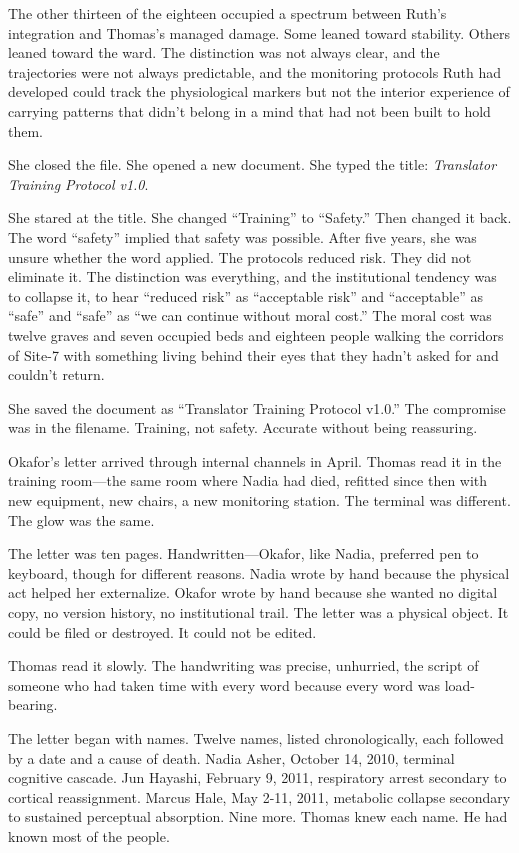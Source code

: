 The other thirteen of the eighteen occupied a spectrum between Ruth's integration and Thomas's managed damage. Some leaned toward stability. Others leaned toward the ward. The distinction was not always clear, and the trajectories were not always predictable, and the monitoring protocols Ruth had developed could track the physiological markers but not the interior experience of carrying patterns that didn't belong in a mind that had not been built to hold them.

She closed the file. She opened a new document. She typed the title: \textit{Translator Training Protocol v1.0}.

She stared at the title. She changed ``Training'' to ``Safety.'' Then changed it back. The word ``safety'' implied that safety was possible. After five years, she was unsure whether the word applied. The protocols reduced risk. They did not eliminate it. The distinction was everything, and the institutional tendency was to collapse it, to hear ``reduced risk'' as ``acceptable risk'' and ``acceptable'' as ``safe'' and ``safe'' as ``we can continue without moral cost.'' The moral cost was twelve graves and seven occupied beds and eighteen people walking the corridors of Site-7 with something living behind their eyes that they hadn't asked for and couldn't return.

She saved the document as ``Translator Training Protocol v1.0.'' The compromise was in the filename. Training, not safety. Accurate without being reassuring.

\scenebreak

Okafor's letter arrived through internal channels in April. Thomas read it in the training room---the same room where Nadia had died, refitted since then with new equipment, new chairs, a new monitoring station. The terminal was different. The glow was the same.

The letter was ten pages. Handwritten---Okafor, like Nadia, preferred pen to keyboard, though for different reasons. Nadia wrote by hand because the physical act helped her externalize. Okafor wrote by hand because she wanted no digital copy, no version history, no institutional trail. The letter was a physical object. It could be filed or destroyed. It could not be edited.

Thomas read it slowly. The handwriting was precise, unhurried, the script of someone who had taken time with every word because every word was load-bearing.

The letter began with names. Twelve names, listed chronologically, each followed by a date and a cause of death. Nadia Asher, October 14, 2010, terminal cognitive cascade. Jun Hayashi, February 9, 2011, respiratory arrest secondary to cortical reassignment. Marcus Hale, May 2-11, 2011, metabolic collapse secondary to sustained perceptual absorption. Nine more. Thomas knew each name. He had known most of the people.

